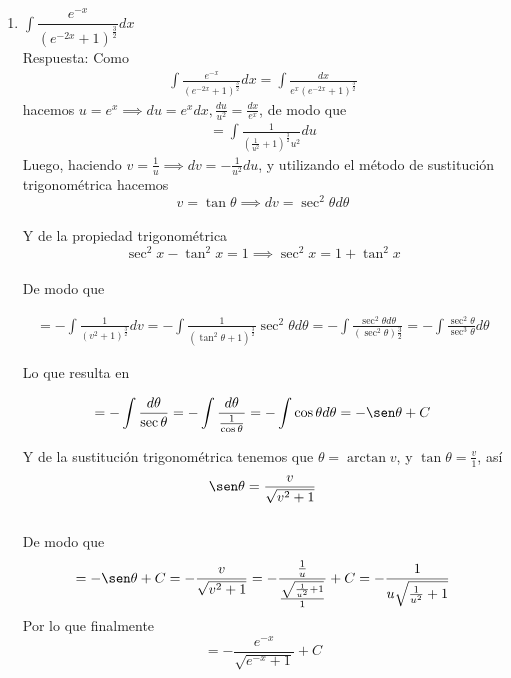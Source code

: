 \documentclass[a4paper,12pt]{report}
\begin{document}
\begin{enumerate}
\begin{enumerate}
		\item $\int \dfrac{e^{-x}}{(e^{-2x} + 1)^{\frac{3}{2}}} dx$
		\\ \vspace{0.5cm}
		Respuesta: Como
		\begin{align*}
			\int \frac{e^{-x}}{(e^{-2x} + 1)^{\frac{3}{2}}} dx = \int \frac{dx}{e^x(e^{-2x} + 1)^\frac{3}{2}}
		\end{align*}
		hacemos $u = e^x \implies du = e^x dx, \frac{du}{u^2} = \frac{dx}{e^x}$, de modo que
		\begin{align*}
			=\int \frac{1}{(\frac{1}{u^2} + 1)^\frac{3}{2} u^2} du
		\end{align*}
		Luego, haciendo $v = \frac{1}{u} \implies dv= -\frac{1}{u^2} du$, y utilizando el método de sustitución trigonométrica hacemos
		\[	v = \tan \theta \implies dv = \sec^2 \theta d\theta \] \\
		Y de la propiedad trigonométrica
		\[\sec^2 x - \tan^2 x = 1 \implies \sec^2 x = 1+\tan^2 x\]\\

		De modo que 

		\begin{align*}
			= -\int \frac{1}{(v^2 + 1)^\frac{3}{2}}dv = -\int \frac{1}{(\tan^2 \theta +1)^\frac{3}{2}} \sec^2 \theta d\theta = -\int \frac{\sec^2 \theta d\theta}{(\sec^2 \theta)\frac{3}{2}} = -\int \frac{\sec^2 \theta}{\sec^3 \theta} d\theta
		\end{align*}

		Lo que resulta en 

		\begin{align*}
			=-\int \frac{d\theta}{\sec \theta} = -\int \frac{d\theta}{\frac{1}{\cos \theta}} = -\int \cos \theta d\theta = -\sen \theta +C
		\end{align*}

		Y de la sustitución trigonométrica tenemos que $\theta = \arctan v$, y $\tan \theta = \frac{v}{1}$, así 
		\[\sen \theta = \frac{v}{\sqrt{v^2 +1}}\]
		\\ De modo que
		\begin{align*}
			= -\sen \theta +C = -\frac{v}{\sqrt{v^2 +1}} = - \frac{\frac{1}{u}}{\frac{\sqrt{\frac{1}{u^2} + 1}}{1}} +C = -\frac{1}{u\sqrt{\frac{1}{u^2} + 1}}
		\end{align*}
		Por lo que finalmente
		\[= -\frac{e^{-x}}{\sqrt{e^{-x} + 1}} + C\]
		

\end{enumerate}
\end{enumerate}
\end{document}

